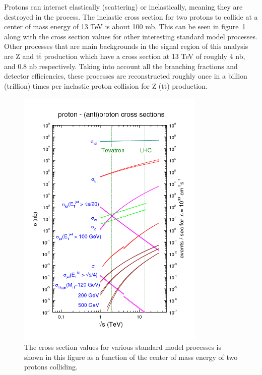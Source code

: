 Protons can interact elastically (scattering) or inelastically, meaning they are destroyed in the process.
The inelastic cross section for two protons to collide at a center of mass energy of 13 TeV is about 100 mb.
This can be seen in figure~\ref{fig:xsecs} along with the cross section values for other interesting
standard model processes.
Other processes that are main backgrounds in the signal region of this analysis are Z and $\mathrm{t\bar{t}}$ production
which have a cross section at 13 TeV of roughly 4 nb, and 0.8 nb respectively.
Taking into account all the branching fractions and detector efficiencies,
these processes are reconstructed roughly once in a billion (trillion) times per inelastic proton collision for Z ($\mathrm{t\bar{t}}$) production.

\begin{figure}[!ht]
  \begin{center}
    \includegraphics[width=0.8\textwidth]{cms/figs/cross-sections.png}
    \caption{
      The cross section values for various standard model processes is shown in this figure as a
      function of the center of mass energy of two protons colliding.
      \label{fig:xsecs}
    }
  \end{center}
\end{figure}


